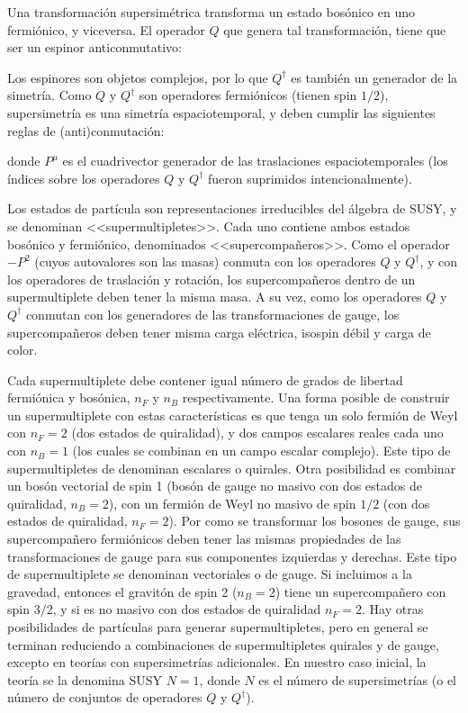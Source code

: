Una transformación supersimétrica transforma un estado bosónico en uno fermiónico, y viceversa. El operador $Q$ que genera tal transformación, tiene que ser un espinor anticonmutativo:


Los espinores son objetos complejos, por lo que $Q^{\dagger}$ es también un generador de la simetría. Como $Q$ y $Q^{\dagger}$ son operadores fermiónicos (tienen spin $1/2$), supersimetría es una simetría espaciotemporal, y deben cumplir las siguientes reglas de (anti)conmutación:


donde $P^{\mu}$ es el cuadrivector generador de las traslaciones espaciotemporales (los índices sobre los operadores $Q$ y $Q^{\dagger}$ fueron suprimidos intencionalmente).


Los estados de partícula son representaciones irreducibles del álgebra de SUSY, y se denominan <<supermultipletes>>. Cada uno contiene ambos estados bosónico y fermiónico, denominados <<supercompañeros>>. Como el operador $-P^2$ (cuyos autovalores son las masas) conmuta con los operadores $Q$ y $Q^{\dagger}$, y con los operadores de traslación y rotación, los supercompañeros dentro de un supermultiplete deben tener la misma masa. A su vez, como los operadores $Q$ y $Q^{\dagger}$ conmutan con los generadores de las transformaciones de gauge, los supercompañeros deben tener misma carga eléctrica, isospin débil y carga de color.

Cada supermultiplete debe contener igual número de grados de libertad fermiónica y bosónica, $n_F$ y $n_B$ respectivamente. Una forma posible de construir un supermultiplete con estas características es que tenga un solo fermión de Weyl con $n_F=2$ (dos estados de quiralidad),
y dos campos escalares reales cada uno con $n_B=1$ (los cuales se combinan en un campo escalar complejo). Este tipo de supermultipletes de denominan escalares o quirales. Otra posibilidad es combinar un bosón vectorial de spin 1 (bosón de gauge no masivo con dos estados de quiralidad, $n_B=2$), con un fermión de Weyl no masivo de spin $1/2$ (con dos estados de quiralidad, $n_F=2$). Por como se transformar los bosones de gauge, sus supercompañero fermiónicos deben tener las mismas propiedades de las transformaciones de gauge para sus componentes izquierdas y derechas. Este tipo de supermultiplete se denominan vectoriales o de gauge. 
Si incluimos a la gravedad, entonces el gravitón \cite{Anduaga:1433401} de spin 2 ($n_B=2$) tiene un supercompañero con spin $3/2$, y si es no masivo con dos estados de quiralidad $n_F=2$. 
Hay otras posibilidades de partículas para generar supermultipletes, pero en general se terminan reduciendo a combinaciones de supermultipletes quirales y de gauge, excepto en teorías con supersimetrías adicionales. En nuestro caso inicial, la teoría se la denomina SUSY $N=1$, donde $N$ es el número de supersimetrías (o el número de conjuntos de operadores $Q$ y $Q^{\dagger}$). 



